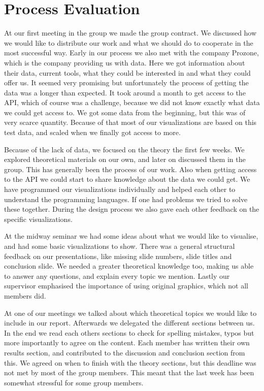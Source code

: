 \documentclass[Report.tex]{subfiles}
\begin{document}
\section*{Process Evaluation}
\pagestyle{empty}
At our first meeting in the group we made the group contract. We discussed how we would like to distribute our work and what we should do to cooperate in the most successful way. Early in our process we also met with the company Prozone, which is the company providing us with data. Here we got information about their data, current tools, what they could be interested in and what they could offer us. It seemed very promising but unfortunately the process of getting the data was a longer than expected. It took around a month to get access to the API, which of course was a challenge, because we did not know exactly what data we could get access to. We got some data from the beginning, but this was of very scarce quantity. Because of that most of our visualizations are based on this test data, and scaled when we finally got access to more.

Because of the lack of data, we focused on the theory the first few weeks. We explored  theoretical materials on our own, and later on discussed them in the group. This has generally been the process of our work. Also when getting access to the API we could start to share knowledge about the data we could get. We have programmed our visualizations individually and helped each other to understand the programming languages. If one had problems we tried to solve these together. During the design process we also gave each other feedback on the specific visualizations. 

At the midway seminar we had some ideas about what we would like to visualise, and had some basic visualizations to show. There was a general structural feedback on our presentations, like missing slide numbers, slide titles and conclusion slide. We needed a greater theoretical knowledge too, making us able to answer any questions, and explain every topic we mention. Lastly our supervisor emphasised the importance of using original graphics, which not all members did.

At one of our meetings we talked about which theoretical topics we would like to include in our report. Afterwards we delegated the different sections between us.  In the end we read each others sections to check for spelling mistakes, typos but more importantly to agree on the content. Each member has written their own results section, and contributed to the discussion and conclusion section from this. We agreed on when to  finish with the theory sections, but this deadline was not met by most of the group members. This meant that the last week has been somewhat stressful for some group members.
\end{document}
